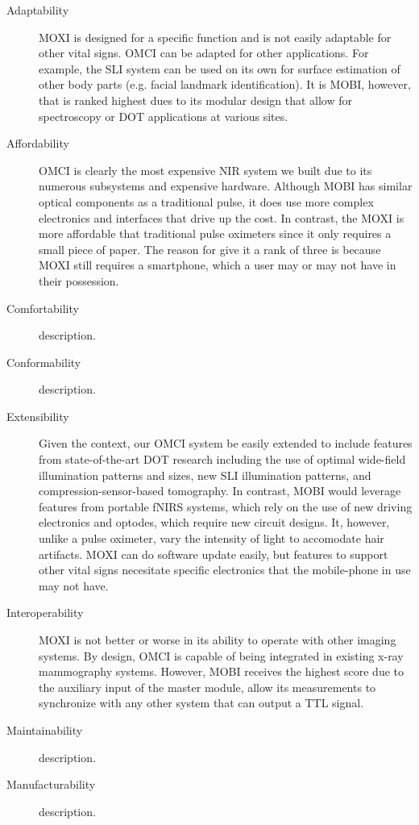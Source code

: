 \begin{description}
   \item[Adaptability] \ac{MOXI} is designed for a specific function and is not easily adaptable for other vital signs. \ac{OMCI} can be adapted for other applications. For example, the \ac{SLI} system can be used on its own for surface estimation of other body parts (e.g. facial landmark identification). It is \ac{MOBI}, however, that is ranked highest dues to its modular design that allow for spectroscopy or \ac{DOT} applications at various sites. 
   \item[Affordability] \ac{OMCI} is clearly the most expensive \ac{NIR} system we built due to its numerous subsystems and expensive hardware. Although \ac{MOBI} has similar optical components as a traditional pulse, it does use more complex electronics and interfaces that drive up the cost. In contrast, the \ac{MOXI} is more affordable that traditional pulse oximeters since it only requires a small piece of paper. The reason for give it a rank of three is because \ac{MOXI} still requires a smartphone, which a user may or may not have in their possession. 
   \item[Comfortability] description.
   \item[Conformability] description.
   \item[Extensibility] Given the context, our \ac{OMCI} system be easily extended to include features from state-of-the-art \ac{DOT} research including the use of optimal wide-field illumination patterns and sizes, new \ac{SLI} illumination patterns, and compression-sensor-based tomography.  In contrast, \ac{MOBI} would leverage features from portable fNIRS systems, which rely on the use of new driving electronics and optodes, which require new circuit designs. It, however, unlike a pulse oximeter, vary the intensity of light to accomodate hair artifacts. \ac{MOXI} can do software update easily, but features to support other vital signs necesitate specific electronics that the mobile-phone in use may not have. 
   \item[Interoperability] \ac{MOXI} is not better or worse in its ability to operate with other imaging systems. By design, \ac{OMCI} is capable of being integrated in existing x-ray mammography systems. However, \ac{MOBI} receives the highest score due to the auxiliary input of the master module, allow its measurements to synchronize with any other system that can output a \ac{TTL} signal. 
   \item[Maintainability] description.
   \item[Manufacturability] description.

\end{description}
